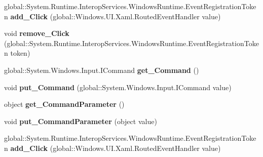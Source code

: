 \begin{DoxyCompactItemize}
global\+::\+System.\+Runtime.\+Interop\+Services.\+Windows\+Runtime.\+Event\+Registration\+Token {\bfseries add\+\_\+\+Click} (global\+::\+Windows.\+U\+I.\+Xaml.\+Routed\+Event\+Handler value)
\item 
\mbox{\label{interface_windows_1_1_u_i_1_1_xaml_1_1_controls_1_1_primitives_1_1_i_button_base_a96ebd008b8c4baa9c89c7671ec31b0a3}} 
void {\bfseries remove\+\_\+\+Click} (global\+::\+System.\+Runtime.\+Interop\+Services.\+Windows\+Runtime.\+Event\+Registration\+Token token)
\item 
\mbox{\label{interface_windows_1_1_u_i_1_1_xaml_1_1_controls_1_1_primitives_1_1_i_button_base_a32d7306ce7ae819ba8afcf8654502772}} 
global\+::\+System.\+Windows.\+Input.\+I\+Command {\bfseries get\+\_\+\+Command} ()
\item 
\mbox{\label{interface_windows_1_1_u_i_1_1_xaml_1_1_controls_1_1_primitives_1_1_i_button_base_a9a50f3b26afbef855e934ed8c1aa1c7a}} 
void {\bfseries put\+\_\+\+Command} (global\+::\+System.\+Windows.\+Input.\+I\+Command value)
\item 
\mbox{\label{interface_windows_1_1_u_i_1_1_xaml_1_1_controls_1_1_primitives_1_1_i_button_base_a844671cebaf433eca7be5733492d0c32}} 
object {\bfseries get\+\_\+\+Command\+Parameter} ()
\item 
\mbox{\label{interface_windows_1_1_u_i_1_1_xaml_1_1_controls_1_1_primitives_1_1_i_button_base_ae70dfa727c7375ca02faf4ed550e7941}} 
void {\bfseries put\+\_\+\+Command\+Parameter} (object value)
\item 
\mbox{\label{interface_windows_1_1_u_i_1_1_xaml_1_1_controls_1_1_primitives_1_1_i_button_base_a810a2e8203417bd2fe1eb15adc0d85b5}} 
global\+::\+System.\+Runtime.\+Interop\+Services.\+Windows\+Runtime.\+Event\+Registration\+Token {\bfseries add\+\_\+\+Click} (global\+::\+Windows.\+U\+I.\+Xaml.\+Routed\+Event\+Handler value)

\end{DoxyCompactItemize}
